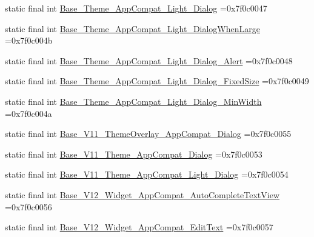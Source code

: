 \begin{DoxyCompactItemize}
static final int \mbox{\hyperlink{classbr_1_1unb_1_1cic_1_1mp_1_1marketmaster_1_1test_1_1R_1_1style_a4403c1df8805db6054d186ab3ae4fc63}{Base\+\_\+\+Theme\+\_\+\+App\+Compat\+\_\+\+Light\+\_\+\+Dialog}} =0x7f0c0047
\item 
static final int \mbox{\hyperlink{classbr_1_1unb_1_1cic_1_1mp_1_1marketmaster_1_1test_1_1R_1_1style_a28058ac5fd78596c85c43ada348a3199}{Base\+\_\+\+Theme\+\_\+\+App\+Compat\+\_\+\+Light\+\_\+\+Dialog\+When\+Large}} =0x7f0c004b
\item 
static final int \mbox{\hyperlink{classbr_1_1unb_1_1cic_1_1mp_1_1marketmaster_1_1test_1_1R_1_1style_aee95d85a552d97f16a63c5898682c371}{Base\+\_\+\+Theme\+\_\+\+App\+Compat\+\_\+\+Light\+\_\+\+Dialog\+\_\+\+Alert}} =0x7f0c0048
\item 
static final int \mbox{\hyperlink{classbr_1_1unb_1_1cic_1_1mp_1_1marketmaster_1_1test_1_1R_1_1style_ae1052a0aa0348c5f1d6564285b176fce}{Base\+\_\+\+Theme\+\_\+\+App\+Compat\+\_\+\+Light\+\_\+\+Dialog\+\_\+\+Fixed\+Size}} =0x7f0c0049
\item 
static final int \mbox{\hyperlink{classbr_1_1unb_1_1cic_1_1mp_1_1marketmaster_1_1test_1_1R_1_1style_a2ace64a20885d22c549387c2fd598677}{Base\+\_\+\+Theme\+\_\+\+App\+Compat\+\_\+\+Light\+\_\+\+Dialog\+\_\+\+Min\+Width}} =0x7f0c004a
\item 
static final int \mbox{\hyperlink{classbr_1_1unb_1_1cic_1_1mp_1_1marketmaster_1_1test_1_1R_1_1style_a36dde14e37d82cdbf386e2033860ad18}{Base\+\_\+\+V11\+\_\+\+Theme\+Overlay\+\_\+\+App\+Compat\+\_\+\+Dialog}} =0x7f0c0055
\item 
static final int \mbox{\hyperlink{classbr_1_1unb_1_1cic_1_1mp_1_1marketmaster_1_1test_1_1R_1_1style_a6c497610a6ee7297cd81693bcc7070c2}{Base\+\_\+\+V11\+\_\+\+Theme\+\_\+\+App\+Compat\+\_\+\+Dialog}} =0x7f0c0053
\item 
static final int \mbox{\hyperlink{classbr_1_1unb_1_1cic_1_1mp_1_1marketmaster_1_1test_1_1R_1_1style_a3a58b761016ad90f1661273dc9b013a8}{Base\+\_\+\+V11\+\_\+\+Theme\+\_\+\+App\+Compat\+\_\+\+Light\+\_\+\+Dialog}} =0x7f0c0054
\item 
static final int \mbox{\hyperlink{classbr_1_1unb_1_1cic_1_1mp_1_1marketmaster_1_1test_1_1R_1_1style_ab8efe63607e56c96e6c9c5a3f7222466}{Base\+\_\+\+V12\+\_\+\+Widget\+\_\+\+App\+Compat\+\_\+\+Auto\+Complete\+Text\+View}} =0x7f0c0056
\item 
static final int \mbox{\hyperlink{classbr_1_1unb_1_1cic_1_1mp_1_1marketmaster_1_1test_1_1R_1_1style_a517034a922c3b8fd4739ad71949c205a}{Base\+\_\+\+V12\+\_\+\+Widget\+\_\+\+App\+Compat\+\_\+\+Edit\+Text}} =0x7f0c0057

\end{DoxyCompactItemize}
